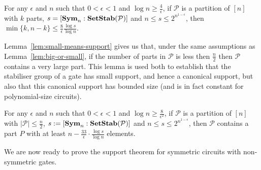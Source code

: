 \documentclass[../paper.tex]{subfiles}
\begin{document}
\begin{lem}
  \label{lem:big-or-small}
  For any $\epsilon$ and $n$ such that $0 < \epsilon < 1$ and $\log n \geq
  \frac{4}{\epsilon}$, if $\mathcal{P}$ is a partition of $[n]$ with $k$ parts,
  $s = [\text{\textbf{Sym}}_n : \text{\textbf{SetStab}} (\mathcal{P})]$ and $n \leq s \leq
  2^{n^{1-\epsilon}}$, then $\min \{k, n-k\} \leq \frac{8}{\epsilon} \frac{\log
    s}{\log n}$.
\end{lem}

Lemma~\ref{lem:small-means-support} gives us that, under the same assumptions as
Lemma~\ref{lem:big-or-small}, if the number of parts in $\mathcal{P}$ is less
then $\frac{n}{2}$ then $\mathcal{P}$ contains a very large part. This lemma is
used both to establish that the stabiliser group of a gate has small support,
and hence a canonical support, but also that this canonical support has bounded
size (and is in fact constant for polynomial-size circuits).

\begin{lem}
  \label{lem:small-means-support}
  For any $\epsilon$ and $n$ such that $0 < \epsilon < 1$ and $\log n \geq
  \frac{8}{\epsilon^2}$, if $\mathcal{P}$ is a partition of $[n]$ with $\vert
  \mathcal{P} \vert \leq \frac{n}{2}$, $s:= [\text{\textbf{Sym}}_n : \text{\textbf{SetStab}} (\mathcal{P})]$
  and $n \leq s \leq 2^{n^{1-\epsilon}}$, then $\mathcal{P}$ contains a part $P$
  with at least $n - \frac{33}{\epsilon} \cdot \frac{\log s} {\log n}$ elements.
\end{lem}


We are now ready to prove the support theorem for symmetric circuits with
non-symmetric gates.
\end{document}
